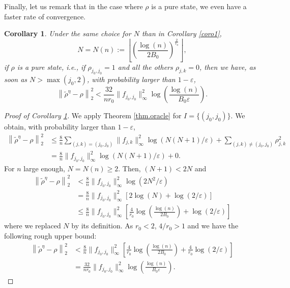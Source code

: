 \documentclass[a4paper]{amsart}
\newtheorem{cor}{Corollary}[section]
\begin{document}
Finally, let us remark that in the case where $\rho$ is a pure state, we even
have a faster rate of convergence.

\begin{cor}
 \label{coro2}
              Under the same choice for $N$ than in Corollary \ref{coro1},
              $$
               N = N(n) := \left\lfloor
\left(\frac{\log(n)}{2B_{0}}\right)^{\frac{2}{r_{0}}} \right\rfloor, 
              $$
            if $\rho$ is a pure state, i.e., if $\rho_{j_0,j_0} = 1$ and all the
others $\rho_{j,k}=0$, then we have, as soon as $N> \max(j_{0},2)$, with
probability larger than $1-\varepsilon$, 
              $$
              \left\|\tilde{\rho}^\eta - \rho \right\|^{2}_{2}  < \frac{32}{n
r_0} \|f_{j_0,j_0}\|_{\infty}^2 \log\left(\frac{\log(n)} {B_0
\varepsilon}\right).
              $$
\end{cor}


\begin{proof}[Proof of Corollary \ref{coro2}]
We apply Theorem \ref{thm.oracle} for $I = \{(j_0,j_0)\}$. We obtain, with
probability larger than
$1-\varepsilon$,
           \begin{align*}
                      \left\|\tilde{\rho}^\eta - \rho \right\|^{2}_{2}& \leq
\frac{8}{n} \sum_{(j,k)=(j_0,j_0)} \|f_{j,k}\|_{\infty}^{2}
                     \log\left(N(N+1)/\varepsilon\right)+ \sum_{(j,k)\neq
(j_0,j_0)}\rho_{j,k}^{2}  \\
                       & = \frac{8}{n} \|f_{j_0,j_0}\|_{\infty}^{2}
                     \log\left(N(N+1)/\varepsilon\right)+ 0.
           \end{align*}
For $n$ large enough,  $N=N(n)\geq2$. Then, $(N+1)< 2N$ and 
           \begin{align*}
                      \left\|\tilde{\rho}^\eta - \rho \right\|^{2}_{2}& < 
\frac{8}{n} \|f_{j_0,j_0}\|_{\infty}^{2}
                     \log\left(2N^2/\varepsilon\right) \\
                     & = \frac{8}{n} \|f_{j_0,j_0}\|_{\infty}^{2} \left[
                     2 \log(N) + \log\left(2/\varepsilon\right) \right] \\
                     & \leq  \frac{8}{n} \|f_{j_0,j_0}\|_{\infty}^{2} \left[
                     \frac{4}{r_{0}} \log\left(\frac{\log(n)}{2B_{0}}\right) +
\log\left(2/\varepsilon\right) \right]
           \end{align*}
where we replaced $N$ by its definition. As $r_0 < 2$, $4/r_0 > 1$ and we have
the following rough upper bound:
 \begin{align*}
                      \left\|\tilde{\rho}^\eta - \rho \right\|^{2}_{2} & <
\frac{8}{n} \|f_{j_0,j_0}\|_{\infty}^{2} \left[
                     \frac{4}{r_{0}} \log\left(\frac{\log(n)}{2B_{0}}\right) + 
\frac{4}{r_{0}}  \log\left(2/\varepsilon\right) \right] \\
                       & = \frac{32}{nr_{0}} \|f_{j_0,j_0}\|_{\infty}^{2}
\log\left(\frac{\log(n)}{B_{0} \varepsilon}\right).
           \end{align*}
 \end{proof}
\end{document}
